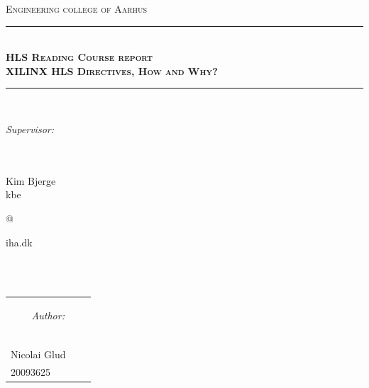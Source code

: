 \newcommand{\HRule}{\rule{\linewidth}{0.5mm}} %

\begin{center} %
 

\textsc{\LARGE Engineering college of Aarhus}\\[1.5cm] %


\HRule \\[0.4cm]
{ \Large \bfseries \textsc{HLS Reading Course report}}\\[0.4cm] %
{ \huge \bfseries \textsc{XILINX HLS Directives, How and Why?}} %
\HRule \\[1.5cm]

\begin{center}
\begin{Large}\textit{Supervisor:}\end{Large}\\
\ \\
Kim Bjerge\\
kbe\begin{Large}@\end{Large}iha.dk
\end{center}
\ \\
\ \\
\begin{table}[H]
\centering
\begin{tabular}{p{4cm} c p{4cm}}
\multicolumn{3}{c}{\begin{Large}\textit{Author:}\end{Large}}\\
\\
\\
\cline{1-1} \cline{3-3}\\
Nicolai Glud &  \\
20093625 
\end{tabular}
\end{table}
\ \\


\end{center}
